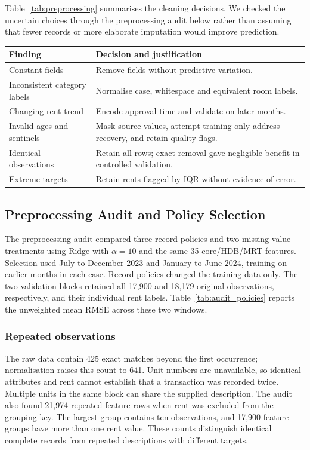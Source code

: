 \documentclass[conference]{IEEEtran}
\makeatletter
\newenvironment{localtable}{\par\addvspace{\medskipamount}\noindent
  \begin{minipage}{\columnwidth}\def\@captype{table}}{\end{minipage}\par
  \addvspace{\medskipamount}}
\makeatother
\begin{document}
Table~\ref{tab:preprocessing} summarises the cleaning decisions. We checked
the uncertain choices through the preprocessing audit below rather than
assuming that fewer records or more elaborate imputation would improve
prediction.

\begin{localtable}
  \caption{EDA findings and the corresponding preprocessing decisions.}
  \label{tab:preprocessing}
  \centering
  \small
  \begin{tabularx}{\columnwidth}{p{}X}
    \toprule
    Finding & Decision and justification \\
    \midrule
    Constant fields & Remove fields without predictive variation. \\
    Inconsistent category labels & Normalise case, whitespace and equivalent
    room labels. \\
    Changing rent trend & Encode approval time and validate on later months. \\
    Invalid ages and sentinels & Mask source values, attempt training-only
    address recovery, and retain quality flags. \\
    Identical observations & Retain all rows; exact removal gave negligible
    benefit in controlled validation. \\
    Extreme targets & Retain rents flagged by IQR without evidence of error. \\
    \bottomrule
  \end{tabularx}
\end{localtable}

\subsection{Preprocessing Audit and Policy Selection}
\label{sec:preprocessing_audit}
The preprocessing audit compared three record policies and two missing-value
treatments using Ridge with $\alpha=10$ and the same 35 core/HDB/MRT features.
Selection used July to December 2023 and January to June 2024, training on
earlier months in each case. Record policies changed the training data only.
The two validation blocks retained all 17,900 and 18,179 original observations,
respectively, and their individual rent labels. Table~\ref{tab:audit_policies}
reports the unweighted mean RMSE across these two windows.

\subsubsection{Repeated observations}
The raw data contain 425 exact matches beyond the first occurrence;
normalisation raises this count to 641. Unit numbers are unavailable, so
identical attributes and rent cannot establish that a transaction was recorded
twice. Multiple units in the same block can share the supplied description.
The audit also found 21,974 repeated feature rows when rent was excluded from
the grouping key. The largest group contains ten observations, and 17,900
feature groups have more than one rent value. These counts distinguish
identical complete records from repeated descriptions with different targets.
\end{document}
